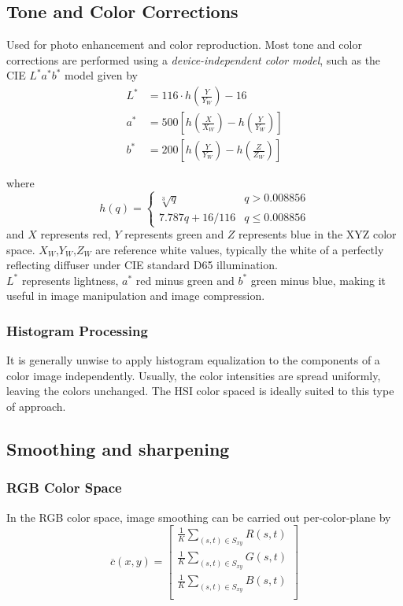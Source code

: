 \subsection{Tone and Color Corrections } 
Used for photo enhancement and color reproduction. Most tone and color corrections are performed using a \textit{device-independent color model}, such as the CIE $L^* a^* b^*$ model given by
\begin{align}
	L^* &= 116 \cdot h(\frac{Y}{Y_W}) - 16 \\
	a^* &= 500 \left[ h(\frac{X}{X_W}) - h(\frac{Y}{Y_W}) \right] \\
	b^* &= 200 \left[ h(\frac{Y}{Y_W}) - h(\frac{Z}{Z_W}) \right]
\end{align}

where
\begin{equation}
	h(q) = \begin{cases}
		\sqrt[3]{q} & q > 0.008856 \\
		7.787q + 16/116 & q \leq 0.008856
	\end{cases}
\end{equation}
and $X$ represents red, $Y$ represents green and $Z$ represents blue in the XYZ color space. $X_W$,$Y_W$,$Z_W$ are reference white values, typically the white of a perfectly reflecting diffuser under CIE standard D65 illumination. \\

$L^*$ represents lightness, $a^*$ red minus green and $b^*$ green minus blue, making it useful in image manipulation and image compression.

\subsubsection{Histogram Processing }
It is generally unwise to apply histogram equalization to the components of a color image independently. Usually, the color intensities are spread uniformly, leaving the colors unchanged. The HSI color spaced is ideally suited to this type of approach.

\subsection{Smoothing and sharpening }
\subsubsection{RGB Color Space}
In the RGB color space, image smoothing can be carried out per-color-plane by
\begin{equation}
	\overline{c}(x,y) = \left[ \begin{array}{l}
		\frac{1}{K} \displaystyle\sum_{(s,t) \in S_{xy}} R(s,t) \\
		\frac{1}{K} \displaystyle\sum_{(s,t) \in S_{xy}} G(s,t) \\
		\frac{1}{K} \displaystyle\sum_{(s,t) \in S_{xy}} B(s,t) \\
	\end{array} \right]
\end{equation}

